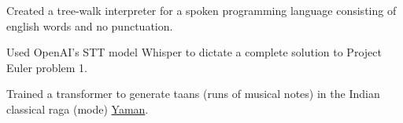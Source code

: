      
    \smallsep
    \begin{tightemize}
        \item Created a tree-walk interpreter for a spoken programming language consisting of english words and no punctuation.
        \item Used OpenAI's STT model Whisper to dictate a complete solution to Project Euler problem 1.
    \end{tightemize}
    \sectionsep 

     
    \smallsep
    \begin{tightemize}
        \item Trained a transformer to generate taans (runs of musical notes) in the Indian classical raga (mode) \href{https://en.wikipedia.org/wiki/Yaman_(raga)}{Yaman}. \href{https://https://www.youtube.com/watch?v=FXV69hGpr4Q}{\color{myyellow} \selectfont{(demo)}}
    \end{tightemize}
    \sectionsep     
    
